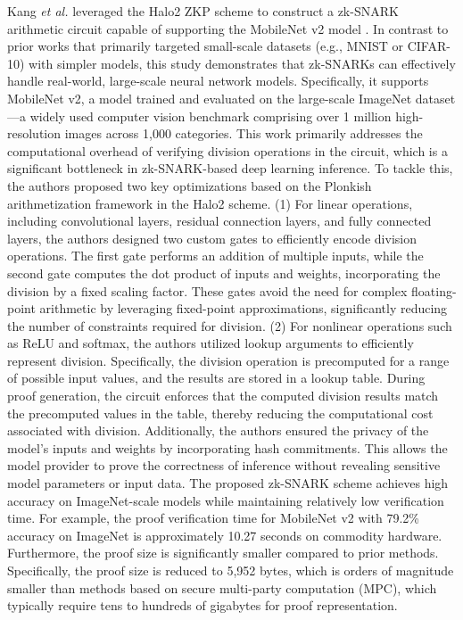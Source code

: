 \documentclass[journal]{IEEEtran}
\begin{document}
Kang \emph{et al.} \cite{kang2022scaling} leveraged the Halo2 ZKP scheme \cite{halo2book} to construct a zk-SNARK arithmetic circuit capable of supporting the MobileNet v2 model \cite{sandler2018mobilenetv2}. In contrast to prior works that primarily targeted small-scale datasets (e.g., MNIST or CIFAR-10) with simpler models, this study demonstrates that zk-SNARKs can effectively handle real-world, large-scale neural network models. Specifically, it supports MobileNet v2, a model trained and evaluated on the large-scale ImageNet dataset---a widely used computer vision benchmark comprising over 1 million high-resolution images across 1,000 categories. This work primarily addresses the computational overhead of verifying division operations in the circuit, which is a significant bottleneck in zk-SNARK-based deep learning inference. To tackle this, the authors proposed two key optimizations based on the Plonkish arithmetization framework \cite{gabizon2019plonk} in the Halo2 scheme. (1) For linear operations, including convolutional layers, residual connection layers, and fully connected layers, the authors designed two custom gates to efficiently encode division operations. The first gate performs an addition of multiple inputs, while the second gate computes the dot product of inputs and weights, incorporating the division by a fixed scaling factor. These gates avoid the need for complex floating-point arithmetic by leveraging fixed-point approximations, significantly reducing the number of constraints required for division. (2) For nonlinear operations such as ReLU and softmax, the authors utilized lookup arguments to efficiently represent division. Specifically, the division operation is precomputed for a range of possible input values, and the results are stored in a lookup table. During proof generation, the circuit enforces that the computed division results match the precomputed values in the table, thereby reducing the computational cost associated with division. Additionally, the authors ensured the privacy of the model's inputs and weights by incorporating hash commitments. This allows the model provider to prove the correctness of inference without revealing sensitive model parameters or input data. The proposed zk-SNARK scheme achieves high accuracy on ImageNet-scale models while maintaining relatively low verification time. For example, the proof verification time for MobileNet v2 with 79.2\% accuracy on ImageNet is approximately 10.27 seconds on commodity hardware. Furthermore, the proof size is significantly smaller compared to prior methods. Specifically, the proof size is reduced to 5,952 bytes, which is orders of magnitude smaller than methods based on secure multi-party computation (MPC), which typically require tens to hundreds of gigabytes for proof representation.
\end{document}
